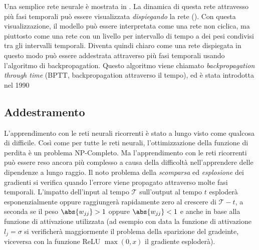 Una semplice rete neurale \`e mostrata in .
La dinamica di questa rete attravesso pi\`u fasi temporali pu\`o essere visualizzata \emph{dispiegando} la rete ().
Con questa visualizzazione, il modello pu\`o essere interpretata come una rete non ciclica, ma piuttosto come una rete con un livello per intervallo di tempo a dei pesi condivisi tra gli intervalli temporali.
Diventa quindi chiaro come una rete dispiegata in questo modo pu\`o essere addestrata attraverso pi\`u fasi temporali usando l'algoritmo di backpropagation.
Questo algoritmo viene chiamato \emph{backpropagation through time} (BPTT, backpropagation attraverso il tempo), ed \`e stata introdotta nel 1990~\cite{Werbos:1990}

\subsection{Addestramento}
L'apprendimento con le reti neurali ricorrenti \`e stato a lungo visto come qualcosa di difficile.
Cos\`i come per tutte le reti neurali, l'ottimizzazione della funzione di perdita \`e un problema NP-Completo.
Ma l'apprendimento con le reti ricorrenti pu\`o essere reso ancora pi\`u complesso a causa della difficolt\`a nell'apprendere delle dipendenze a lungo raggio.
Il noto problema della \emph{scomparsa} ed \emph{esplosione} dei gradienti si verifica quando l'errore viene propagato attraverso molte fasi temporali.
L'impatto dell'input al tempo $\mathcal{T}$ sull'output al tempo $t$ esploder\`a esponenzialmente oppure raggiunger\`a rapidamente zero al crescere di $\mathcal{T} - t$, a seconda se il peso $\abs{w_{jj}}>1$ oppure $\abs{w_{jj}}<1$ e anche in base alla funzione di attivazione utilizzata
(ad esempio con data la funzione di attivazione $l_j = \sigma$ si verificher\`a maggiormente il problema della sparizione del gradeinte, viceversa con la funzione ReLU $\operatorname{max}(0, x)$ il gradiente esploder\`a).
